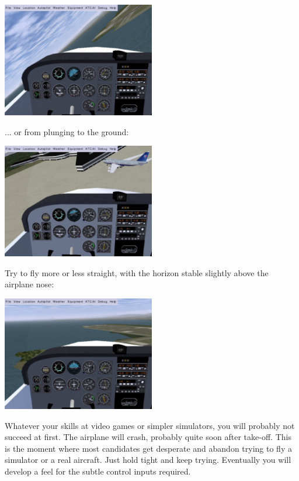 \begin{itemize}
\begin{center}
\includegraphics[width=0.5\textwidth]{img/tut_12}
\end{center}

... or from plunging to the ground:


\begin{center}
\includegraphics[width=0.5\textwidth]{img/tut_13}
\end{center}

Try to fly more or less straight, with the horizon stable slightly above the
airplane nose:

\begin{center}
\includegraphics[width=0.5\textwidth]{img/tut_15}
\end{center}

Whatever your skills at video games or simpler simulators, you will probably
not succeed at first. The airplane will crash, probably quite soon after
take-off. This is the moment where most candidates get desperate and abandon
trying to fly a simulator or a real aircraft. Just hold tight and keep trying.
Eventually you will develop a feel for the subtle control inputs required.


\end{itemize}
